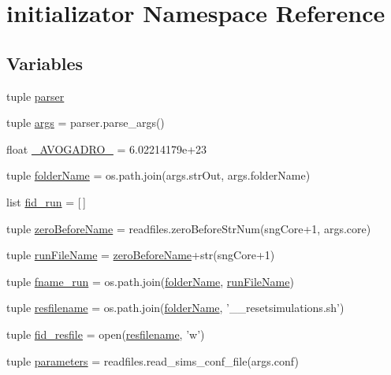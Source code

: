 \hypertarget{a00104}{\section{initializator Namespace Reference}
\label{a00104}
}
\subsection*{Variables}
\begin{DoxyCompactItemize}
\item 
tuple \hyperlink{a00104_af2659789ba1896029e3ab9bfbf83d019}{parser}
\item 
tuple \hyperlink{a00104_aedb2e5b77a354ccd69d9d38b3c30f61a}{args} = parser.\-parse\-\_\-args()
\item 
float \hyperlink{a00104_a01b3b6a0972397f230c35bd2fb8effc4}{\-\_\-\-A\-V\-O\-G\-A\-D\-R\-O\-\_\-} = 6.\-02214179e+23
\item 
tuple \hyperlink{a00104_aa51c106700ef9afbdb94a1c800e10569}{folder\-Name} = os.\-path.\-join(args.\-str\-Out, args.\-folder\-Name)
\item 
list \hyperlink{a00104_a6015a676cc06fdae98b1cca15d92b883}{fid\-\_\-run} = \mbox{[}$\,$\mbox{]}
\item 
tuple \hyperlink{a00104_a475e51ace78f2490aa4206915d0e3ae6}{zero\-Before\-Name} = readfiles.\-zero\-Before\-Str\-Num(sng\-Core+1, args.\-core)
\item 
tuple \hyperlink{a00104_a47868487619848c8ead2458c6855426a}{run\-File\-Name} = \hyperlink{a00104_a475e51ace78f2490aa4206915d0e3ae6}{zero\-Before\-Name}+str(sng\-Core+1)
\item 
tuple \hyperlink{a00104_a6bc5100ec1c6492cec974172df243857}{fname\-\_\-run} = os.\-path.\-join(\hyperlink{a00104_aa51c106700ef9afbdb94a1c800e10569}{folder\-Name}, \hyperlink{a00104_a47868487619848c8ead2458c6855426a}{run\-File\-Name})
\item 
tuple \hyperlink{a00104_abd0e948553283c71e145460abdb3e766}{resfilename} = os.\-path.\-join(\hyperlink{a00104_aa51c106700ef9afbdb94a1c800e10569}{folder\-Name}, '\-\_\-\-\_\-resetsimulations.\-sh')
\item 
tuple \hyperlink{a00104_aec4081e394ea2eebcedadf723268f970}{fid\-\_\-resfile} = open(\hyperlink{a00104_abd0e948553283c71e145460abdb3e766}{resfilename}, 'w')
\item 
tuple \hyperlink{a00104_a646de756d594b9a0eebf18c4eb9ee0d6}{parameters} = readfiles.\-read\-\_\-sims\-\_\-conf\-\_\-file(args.\-conf)
\item 

\end{DoxyCompactItemize}
